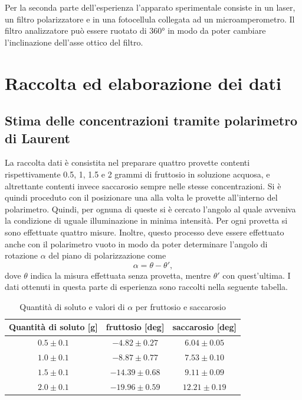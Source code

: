 \documentclass{article}
\begin{document}
Per la seconda parte dell'esperienza l'apparato sperimentale consiste in un laser, un filtro polarizzatore e in una fotocellula collegata ad un microamperometro. Il filtro analizzatore può essere ruotato di 360° in modo da poter cambiare l'inclinazione dell'asse ottico del filtro.

\section{Raccolta ed elaborazione dei dati}
\subsection{Stima delle concentrazioni tramite polarimetro di Laurent}
La raccolta dati è consistita nel preparare quattro provette contenti rispettivamente 0.5, 1, 1.5 e 2 grammi di fruttosio in soluzione acquosa, e altrettante contenti invece saccarosio sempre nelle stesse concentrazioni. Si è quindi proceduto con il posizionare una alla volta le provette all'interno del polarimetro. Quindi, per ognuna di queste si è cercato l'angolo al quale avveniva la condizione di uguale illuminazione in minima intensità. Per ogni provetta si sono effettuate quattro misure. Inoltre, questo processo deve essere effettuato anche con il polarimetro vuoto in modo da poter determinare l'angolo di rotazione $\alpha$ del piano di polarizzazione come
\begin{equation}
    \label{eq:angolo alpha}
    \alpha=\theta-\theta ',
\end{equation}
dove $\theta$ indica la misura effettuata senza provetta, mentre $\theta '$ con quest'ultima. I dati ottenuti in questa parte di esperienza sono raccolti nella seguente tabella.
\begin{table}[h]
    \centering
    \begin{tabular}{|c|c|c|}
        \hline
        \textbf{Quantità di soluto [g]} & \bm{$\alpha$}\textbf{ fruttosio [deg]} & \bm{$\alpha$} \textbf{saccarosio [deg]} \\
        \hline
        $0.5 \pm 0.1$ & $-4.82 \pm 0.27$ & $6.04 \pm 0.05$ \\
        \hline
        $1.0 \pm 0.1$ & $-8.87 \pm 0.77$ & $7.53 \pm 0.10$ \\
        \hline
        $1.5 \pm 0.1$ & $-14.39 \pm 0.68$ & $9.11 \pm 0.09$ \\
        \hline
        $2.0 \pm 0.1$ & $-19.96 \pm 0.59$ & $12.21 \pm 0.19$ \\
        \hline
    \end{tabular}
    \caption{Quantità di soluto e valori di $\alpha$ per fruttosio e saccarosio}
    \label{tab:angoli zuccheri}
\end{table}
\end{document}
